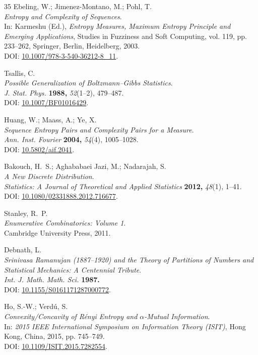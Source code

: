\documentclass{article}
\theoremstyle{remark}
\begin{document}
\begin{thebibliography}{35}
Ebeling, W.; Jimenez-Montano, M.; Pohl, T.\\
\textit{Entropy and Complexity of Sequences}.\\
In: Karmeshu (Ed.), \textit{Entropy Measures, Maximum Entropy Principle and Emerging Applications}, Studies in Fuzziness and Soft Computing, vol. 119, pp. 233--262, Springer, Berlin, Heidelberg, 2003.\\
DOI: \href{https://doi.org/10.1007/978-3-540-36212-8_11}{10.1007/978-3-540-36212-8\_11}.

Tsallis, C.\\
\textit{Possible Generalization of Boltzmann--Gibbs Statistics}.\\
\textit{J. Stat. Phys.} \textbf{1988,} \textit{52}(1--2), 479--487.\\
DOI: \href{https://doi.org/10.1007/BF01016429}{10.1007/BF01016429}.

Huang, W.; Maass, A.; Ye, X.\\
\textit{Sequence Entropy Pairs and Complexity Pairs for a Measure}.\\
\textit{Ann. Inst. Fourier} \textbf{2004,} \textit{54}(4), 1005--1028.\\
DOI: \href{https://doi.org/10.5802/aif.2041}{10.5802/aif.2041}.

Bakouch, H.~S.; Aghababaei Jazi, M.; Nadarajah, S.\\
\textit{A New Discrete Distribution}.\\
\textit{Statistics: A Journal of Theoretical and Applied Statistics} \textbf{2012,} \textit{48}(1), 1--41.\\
DOI: \href{https://doi.org/10.1080/02331888.2012.716677}{10.1080/02331888.2012.716677}.

Stanley, R.~P.\\
\textit{Enumerative Combinatorics: Volume 1}.\\
Cambridge University Press, 2011.

Debnath, L.\\
\textit{Srinivasa Ramanujan (1887--1920) and the Theory of Partitions of Numbers and Statistical Mechanics: A Centennial Tribute}.\\
\textit{Int. J. Math. Math. Sci.} \textbf{1987.}\\
DOI: \href{https://doi.org/10.1155/S0161171287000772}{10.1155/S0161171287000772}.

Ho, S.-W.; Verd\'{u}, S.\\
\textit{Convexity/Concavity of R\'{e}nyi Entropy and $\alpha$-Mutual Information}.\\
In: \textit{2015 IEEE International Symposium on Information Theory (ISIT)}, Hong Kong, China, 2015, pp. 745--749.\\
DOI: \href{https://doi.org/10.1109/ISIT.2015.7282554}{10.1109/ISIT.2015.7282554}.


\end{thebibliography}
\end{document}
